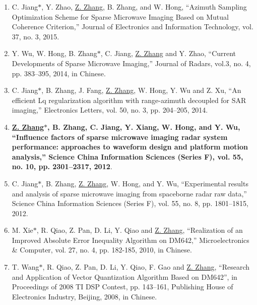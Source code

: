 \documentclass[paper=a4,fontsize=11pt]{scrartcl}
\begin{document}
\begin{enumerate}
\item C. Jiang$\ast$, Y. Zhao, \underline{Z. Zhang}, B. Zhang, and W. Hong, ``Azimuth Sampling Optimization Scheme for Sparse Microwave Imaging Based on Mutual Coherence Criterion,'' Journal of Electronics and Information Technology, vol. 37, no. 3, 2015.

\item Y. Wu, W. Hong, B. Zhang$\ast$, C. Jiang, \underline{Z. Zhang} and Y. Zhao, ``Current Developments of Sparse Microwave Imaging,'' Journal of Radars, vol.3, no. 4, pp. 383--395, 2014, in Chinese.

\item C. Jiang$\ast$, B. Zhang, J. Fang, \underline{Z. Zhang}, W. Hong, Y. Wu and Z. Xu, ``An efficient Lq regularization algorithm with range-azimuth decoupled for SAR imaging,'' Electronics Letters, vol. 50, no. 3, pp. 204--205, 2014.

\item \textbf{\underline{Z. Zhang$\ast$}, B. Zhang, C. Jiang, Y. Xiang, W. Hong, and Y. Wu, ``Influence factors of sparse microwave imaging radar system performance: approaches to waveform design and platform motion analysis,'' Science China Information Sciences (Series F), vol. 55, no. 10, pp. 2301--2317, 2012}.

\item C. Jiang$\ast$, B. Zhang, \underline{Z. Zhang}, W. Hong, and Y. Wu, ``Experimental results and analysis of sparse microwave imaging from spaceborne radar raw data,'' Science China Information Sciences (Series F), vol. 55, no. 8, pp. 1801--1815, 2012.


\item M. Xie$\ast$, R. Qiao, Z. Pan, D. Li, Y. Qiao and \underline{Z. Zhang}, ``Realization of an Improved Absolute Error Inequality Algorithm on DM642,'' Microelectronics \& Computer, vol. 27, no. 4, pp. 182-185, 2010, in Chinese.

\item T. Wang$\ast$, R. Qiao, Z. Pan, D. Li, Y. Qiao, F. Gao and \underline{Z. Zhang}, ``Research and Application of Vector Quantization Algorithm Based on DM642'', in Proceedings of 2008 TI DSP Contest, pp. 143--161, Publishing House of Electronics Industry, Beijing, 2008, in Chinese. 

~\\
	
\end{enumerate}
\end{document}
